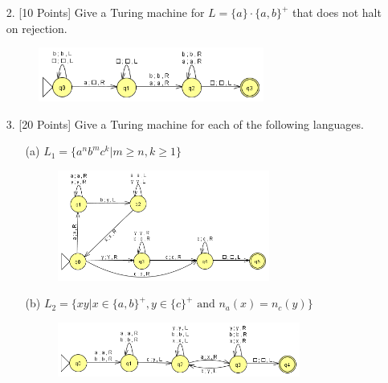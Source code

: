 \documentclass[12pt]{article}
\begin{document}
\begin{spacing}{1.5}
\begin{enumerate}
                  \newpage
            \item[2.] [10 Points] Give a Turing machine for $L=\{a \} \cdot \{a,b \}^+$ that does not halt on rejection.

                  \begin{figure}[h!]
                        \centering
                        \includegraphics[width=0.7\textwidth]{img/q2/q2.png}
                  \end{figure}

                  \newpage
            \item[3.] [20 Points] Give a Turing machine for each of the following languages.

                  \begin{enumerate}
                        \item[(a)] $L_1 = \{a^nb^mc^k | m \geq n, k \geq 1 \}$

                              \begin{figure}[h!]
                                    \centering
                                    \includegraphics[width=0.7\textwidth]{img/q3/q3a.png}
                              \end{figure}

                        \item[(b)] $L_2 = \{xy | x \in \{a,b \}^+, y \in \{c\}^+ \text{ and } n_a(x)=n_c(y) \}$

                              \begin{figure}[h!]
                                    \centering
                                    \includegraphics[width=0.8\textwidth]{img/q3/q3b.png}
                              \end{figure}


\end{enumerate}
\end{enumerate}
\end{spacing}
\end{document}
